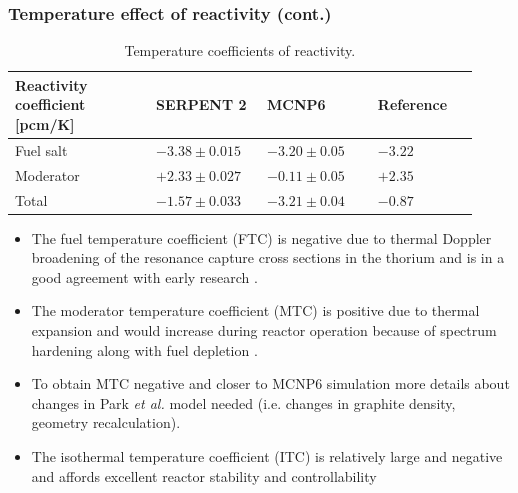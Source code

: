 \begin{frame}
  \frametitle{Temperature effect of reactivity (cont.)}
  \vspace{-0.1in}
  \captionsetup[table]{
  labelsep = newline,
  name = TABLE, justification=justified,
  singlelinecheck=false,%
  labelsep=colon,%
  skip = \medskipamount}  
  \begin{table}[h!]
    \caption{Temperature coefficients of reactivity.}
      \vspace{-0.2in}
  \begin{tabular}{p{0.28\linewidth} p{0.22\linewidth} p{0.22\linewidth} 
        p{0.20\linewidth}} \toprule
   Reactivity coefficient [pcm/K]  & SERPENT 2      & MCNP6 
        \cite{park_whole_2015}   & Reference \cite{robertson_conceptual_1971}      
        \\ \midrule
Fuel salt        & $-3.38\pm0.015$ & $-3.20\pm0.05$ & $-3.22$ \\ \midrule
Moderator        & $+2.33\pm0.027$ & $-0.11\pm0.05$ & $+2.35$ \\ \midrule
Total            & $-1.57\pm0.033$ & $-3.21\pm0.04$ & $-0.87$ \\
\bottomrule
\end{tabular}
  \label{tab:tcoef}
\end{table}
        \begin{itemize}
       \item The fuel temperature coefficient (FTC) is negative due to
         thermal Doppler broadening of the resonance capture cross
         sections in the thorium and is in a good agreement with early research
         \cite{robertson_conceptual_1971, park_whole_2015}.
       \item The moderator temperature coefficient (MTC) is positive due to thermal expansion
         and would increase during reactor operation because of spectrum hardening along
         with fuel depletion \cite{park_whole_2015}.
       \item To obtain MTC negative and closer to MCNP6 simulation more details about
         changes in Park \emph{et al.} model needed (i.e. changes in graphite density, geometry recalculation).
       \item The isothermal temperature coefficient (ITC) is relatively large and negative and
         affords excellent reactor stability and controllability
       \end{itemize}
\end{frame}
